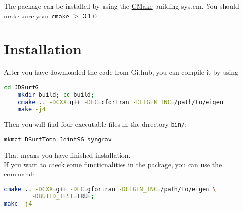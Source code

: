 \documentclass[UTF8]{article}
\begin{document}
The package can be installed by using the \href{https://cmake.org/}{CMake} building system. You should make sure your \texttt{cmake} $\geq$ 3.1.0.

\section{Installation}
After you have downloaded the code from Github,
you can compile it by using
\begin{lstlisting}[language=bash]
    cd JDSurfG
    mkdir build; cd build;
    cmake .. -DCXX=g++ -DFC=gfortran -DEIGEN_INC=/path/to/eigen
    make -j4
\end{lstlisting}
Then you will find four executable files in the 
directory \texttt{bin/}:
\begin{lstlisting}[language=bash]
    mkmat DSurfTomo JointSG syngrav  
\end{lstlisting}
That means you have finished installation. \\

If you want to check some functionalities in the package, you can use the command:
\begin{lstlisting}[language=bash]
cmake .. -DCXX=g++ -DFC=gfortran -DEIGEN_INC=/path/to/eigen \
        -DBUILD_TEST=TRUE;
make -j4
\end{lstlisting}
\end{document}
